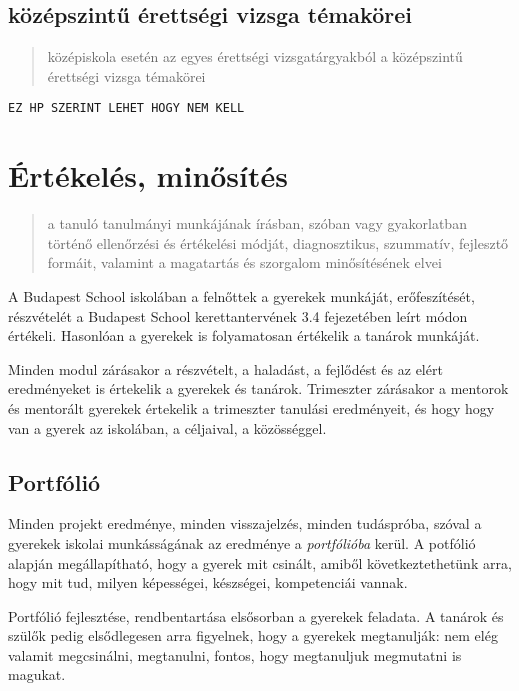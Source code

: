 \subsection{középszintű érettségi vizsga
témakörei}\label{kuxf6zuxe9pszintux171-uxe9rettsuxe9gi-vizsga-tuxe9makuxf6rei}

\begin{quote}
középiskola esetén az egyes érettségi vizsgatárgyakból a középszintű
érettségi vizsga témakörei
\end{quote}

\texttt{EZ\ HP\ SZERINT\ LEHET\ HOGY\ NEM\ KELL}

\section{Értékelés,
minősítés}\label{uxe9rtuxe9keluxe9s-minux151suxedtuxe9s}

\begin{quote}
a tanuló tanulmányi munkájának írásban, szóban vagy gyakorlatban történő
ellenőrzési és értékelési módját, diagnosztikus, szummatív, fejlesztő
formáit, valamint a magatartás és szorgalom minősítésének elvei
\end{quote}

A Budapest School iskolában a felnőttek a gyerekek munkáját,
erőfeszítését, részvételét a Budapest School kerettantervének 3.4
fejezetében leírt módon értékeli. Hasonlóan a gyerekek is folyamatosan
értékelik a tanárok munkáját.

Minden modul zárásakor a részvételt, a haladást, a fejlődést és az elért
eredményeket is értekelik a gyerekek és tanárok. Trimeszter zárásakor a
mentorok és mentorált gyerekek értekelik a trimeszter tanulási
eredményeit, és hogy hogy van a gyerek az iskolában, a céljaival, a
közösséggel.

\subsection{Portfólió}\label{portfuxf3liuxf3}

Minden projekt eredménye, minden visszajelzés, minden tudáspróba, szóval
a gyerekek iskolai munkásságának az eredménye a \emph{portfólióba}
kerül. A potfólió alapján megállapítható, hogy a gyerek mit csinált,
amiből következtethetünk arra, hogy mit tud, milyen képességei,
készségei, kompetenciái vannak.

Portfólió fejlesztése, rendbentartása elsősorban a gyerekek feladata. A
tanárok és szülők pedig elsődlegesen arra figyelnek, hogy a gyerekek
megtanulják: nem elég valamit megcsinálni, megtanulni, fontos, hogy
megtanuljuk megmutatni is magukat.

